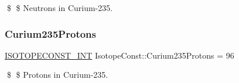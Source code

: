 \$ \$ Neutrons in Curium-\/235. \mbox{\label{group___isotope_const-_curium-_cm235_gacfb5ddf2abcbb42ce22979be29e958f8}} 
\subsubsection{\texorpdfstring{Curium235\+Protons}{Curium235Protons}}
{\footnotesize\ttfamily \mbox{\hyperlink{group___isotope_const-_macros_ga5f18360b3e99483a35c32d789e62621c}{I\+S\+O\+T\+O\+P\+E\+C\+O\+N\+S\+T\+\_\+\+I\+NT}} Isotope\+Const\+::\+Curium235\+Protons = 96}

\$ \$ Protons in Curium-\/235. 